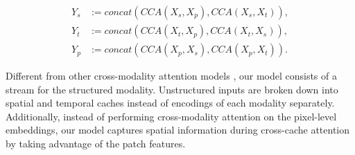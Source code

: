 \documentclass{article}
\begin{document}

\begin{displaymath}
\begin{split}
    Y_s &:= concat (CCA(X_{s}, X_{p}), CCA(X_{s}, X_{t})), \\ %
    Y_t &:= concat (CCA(X_{t}, X_{p}), CCA(X_{t}, X_{s})), \\ %
    Y_p &:= concat (CCA(X_{p}, X_{s}), CCA(X_{p}, X_{t})) .%
\end{split}
\end{displaymath}

\noindent Different from other cross-modality attention models \cite{tsai2019multimodal,tan2019lxmert}, our model consists of a stream for the structured modality.  Unstructured inputs are broken down into spatial and temporal caches instead of encodings of each modality separately. Additionally, instead of performing cross-modality attention on the pixel-level embeddings, our model captures spatial information during cross-cache attention by taking advantage of the patch features.




\end{document}
